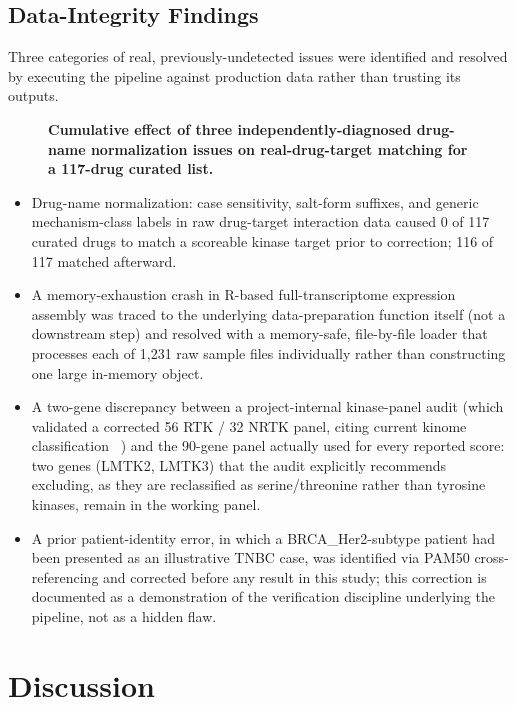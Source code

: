 \documentclass[10pt,letterpaper]{article}
\begin{document}
\subsection*{Data-Integrity Findings}
Three categories of real, previously-undetected issues were identified and resolved by executing the pipeline against production data rather than trusting its outputs.

\begin{figure}[!h]
\caption{\textbf{Cumulative effect of three independently-diagnosed drug-name normalization issues on real-drug-target matching for a 117-drug curated list.} }
\label{fig5}
\end{figure}

\begin{itemize}
\item Drug-name normalization: case sensitivity, salt-form suffixes, and generic mechanism-class labels in raw drug-target interaction data caused 0 of 117 curated drugs to match a scoreable kinase target prior to correction; 116 of 117 matched afterward.
\item A memory-exhaustion crash in R-based full-transcriptome expression assembly was traced to the underlying data-preparation function itself (not a downstream step) and resolved with a memory-safe, file-by-file loader that processes each of 1,231 raw sample files individually rather than constructing one large in-memory object.
\item A two-gene discrepancy between a project-internal kinase-panel audit (which validated a corrected 56 RTK / 32 NRTK panel, citing current kinome classification ~\cite{bib1,bib2,bib15}) and the 90-gene panel actually used for every reported score: two genes (LMTK2, LMTK3) that the audit explicitly recommends excluding, as they are reclassified as serine/threonine rather than tyrosine kinases, remain in the working panel.
\item A prior patient-identity error, in which a BRCA\_Her2-subtype patient had been presented as an illustrative TNBC case, was identified via PAM50 cross-referencing and corrected before any result in this study; this correction is documented as a demonstration of the verification discipline underlying the pipeline, not as a hidden flaw.
\end{itemize}

\section*{Discussion}
\end{document}

